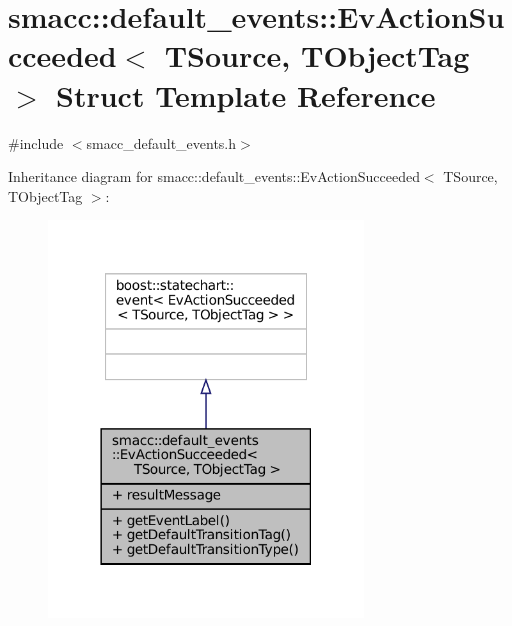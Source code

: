 \hypertarget{structsmacc_1_1default__events_1_1EvActionSucceeded}{}\section{smacc\+:\+:default\+\_\+events\+:\+:Ev\+Action\+Succeeded$<$ T\+Source, T\+Object\+Tag $>$ Struct Template Reference}
\label{structsmacc_1_1default__events_1_1EvActionSucceeded}


{\ttfamily \#include $<$smacc\+\_\+default\+\_\+events.\+h$>$}



Inheritance diagram for smacc\+:\+:default\+\_\+events\+:\+:Ev\+Action\+Succeeded$<$ T\+Source, T\+Object\+Tag $>$\+:
\nopagebreak
\begin{figure}[H]
\begin{center}
\leavevmode
\includegraphics[width=237pt]{structsmacc_1_1default__events_1_1EvActionSucceeded__inherit__graph}
\end{center}
\end{figure}


